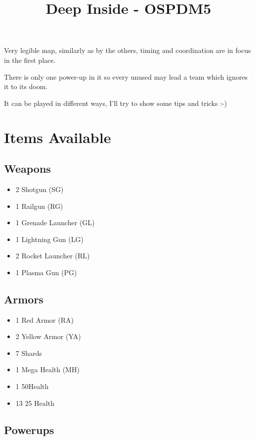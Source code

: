 \documentclass[11pt]{article}
\title{Deep Inside - OSPDM5}
\author{}
\date{}
\begin{document}
\maketitle

\setcounter{tocdepth}{3}
\tableofcontents
\vspace*{1cm}
 
Very legible map, similarly as by the others, timing and coordination  are in
focus in the first place.

There is only one power-up in it so every unused may lead a team which ignores
it to its doom.

It can be played in different ways, I'll try to show some tips and tricks :-) 

\section{Items Available}
\label{sec-1}
\subsection{Weapons}
\label{sec-1_1}

\begin{itemize}
\item 2 Shotgun (SG)
\item 1 Railgun (RG)
\item 1 Grenade Launcher (GL)
\item 1 Lightning Gun (LG)
\item 2 Rocket Launcher (RL)
\item 1 Plasma Gun (PG)
\end{itemize}
\subsection{Armors}
\label{sec-1_2}

\begin{itemize}
\item 1 Red Armor (RA)
\item 2 Yellow Armor (YA)
\item 7 Shards
\item 1 Mega Health (MH)
\item 1 50Health
\item 13 25 Health
\end{itemize}
\subsection{Powerups}
\label{sec-1_3}
\end{document}
